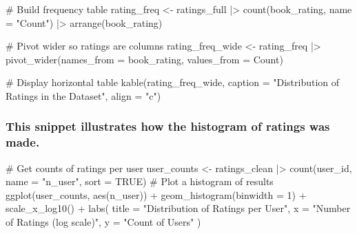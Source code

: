\documentclass[
  12pt]{article}
\newenvironment{Shaded}{\begin{snugshade}}{\end{snugshade}}
\newcommand{\AttributeTok}[1]{\textcolor[rgb]{0.40,0.45,0.13}{#1}}
\newcommand{\CommentTok}[1]{\textcolor[rgb]{0.37,0.37,0.37}{#1}}
\newcommand{\ConstantTok}[1]{\textcolor[rgb]{0.56,0.35,0.01}{#1}}
\newcommand{\DecValTok}[1]{\textcolor[rgb]{0.68,0.00,0.00}{#1}}
\newcommand{\FunctionTok}[1]{\textcolor[rgb]{0.28,0.35,0.67}{#1}}
\newcommand{\NormalTok}[1]{\textcolor[rgb]{0.00,0.23,0.31}{#1}}
\newcommand{\OtherTok}[1]{\textcolor[rgb]{0.00,0.23,0.31}{#1}}
\newcommand{\SpecialCharTok}[1]{\textcolor[rgb]{0.37,0.37,0.37}{#1}}
\newcommand{\StringTok}[1]{\textcolor[rgb]{0.13,0.47,0.30}{#1}}
\begin{document}
\begin{Shaded}
\begin{Highlighting}[]
\CommentTok{\# Build frequency table}
\NormalTok{rating\_freq }\OtherTok{\textless{}{-}}\NormalTok{ ratings\_full }\SpecialCharTok{|\textgreater{}}
  \FunctionTok{count}\NormalTok{(book\_rating, }\AttributeTok{name =} \StringTok{"Count"}\NormalTok{) }\SpecialCharTok{|\textgreater{}}
  \FunctionTok{arrange}\NormalTok{(book\_rating)}

\CommentTok{\# Pivot wider so ratings are columns}
\NormalTok{rating\_freq\_wide }\OtherTok{\textless{}{-}}\NormalTok{ rating\_freq }\SpecialCharTok{|\textgreater{}}
  \FunctionTok{pivot\_wider}\NormalTok{(}\AttributeTok{names\_from =}\NormalTok{ book\_rating, }\AttributeTok{values\_from =}\NormalTok{ Count)}

\CommentTok{\# Display horizontal table}
\FunctionTok{kable}\NormalTok{(rating\_freq\_wide,}
      \AttributeTok{caption =} \StringTok{"Distribution of Ratings in the Dataset"}\NormalTok{,}
      \AttributeTok{align =} \StringTok{"c"}\NormalTok{)}
\end{Highlighting}
\end{Shaded}

\subsubsection{This snippet illustrates how the histogram of ratings was
made.}\label{sec-code4}

\begin{Shaded}
\begin{Highlighting}[]
\CommentTok{\# Get counts of ratings per user }
\NormalTok{user\_counts }\OtherTok{\textless{}{-}}\NormalTok{ ratings\_clean }\SpecialCharTok{|\textgreater{}} 
  \FunctionTok{count}\NormalTok{(user\_id, }\AttributeTok{name =} \StringTok{"n\_user"}\NormalTok{, }\AttributeTok{sort =} \ConstantTok{TRUE}\NormalTok{)}
\CommentTok{\# Plot a histogram of results}
\FunctionTok{ggplot}\NormalTok{(user\_counts, }\FunctionTok{aes}\NormalTok{(n\_user)) }\SpecialCharTok{+} 
  \FunctionTok{geom\_histogram}\NormalTok{(}\AttributeTok{binwidth =} \DecValTok{1}\NormalTok{) }\SpecialCharTok{+}
  \FunctionTok{scale\_x\_log10}\NormalTok{() }\SpecialCharTok{+}
  \FunctionTok{labs}\NormalTok{(}
    \AttributeTok{title =} \StringTok{"Distribution of Ratings per User"}\NormalTok{,}
    \AttributeTok{x =} \StringTok{"Number of Ratings (log scale)"}\NormalTok{,}
    \AttributeTok{y =} \StringTok{"Count of Users"}
\NormalTok{  ) }
\end{Highlighting}
\end{Shaded}
\end{document}
